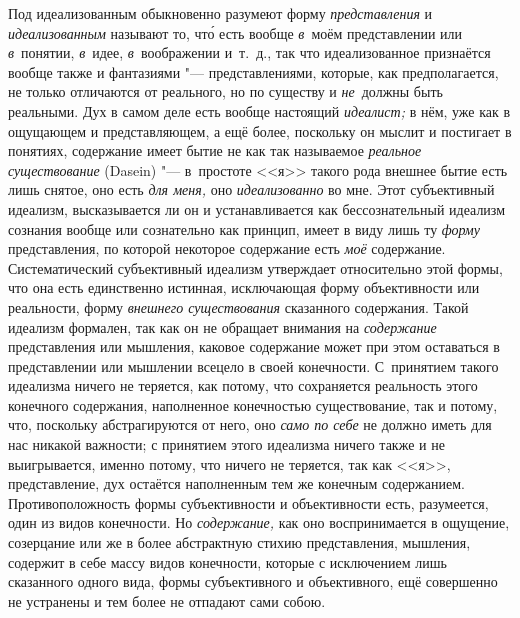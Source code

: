 Под идеализованным обыкновенно разумеют форму {\em представления} и
{\em идеализованным} называют то, чт\'{о} есть вообще
{\em в}~моём представлении или {\em в}~понятии, {\em в}~идее,
{\em в}~воображении и~т.~д., так что идеализованное
признаётся вообще также и фантазиями "--- представлениями, которые, как
предполагается, не только отличаются от реального, но по существу и
{\em не}~должны быть реальными. Дух в самом деле есть
вообще настоящий {\em идеалист;} в нём, уже как в
ощущающем и представляющем, а ещё более, поскольку он мыслит и постигает в
понятиях, содержание имеет бытие не как так называемое
{\em реальное существование} (Dasein) "--- в~простоте <<я>>
такого рода внешнее бытие есть лишь снятое, оно есть {\em для меня,} оно
{\em идеализованно} во мне. Этот субъективный идеализм,
высказывается ли он и устанавливается как бессознательный идеализм сознания
вообще или сознательно как принцип, имеет в виду лишь ту
{\em форму} представления, по которой некоторое
содержание есть {\em моё} содержание. Систематический
субъективный идеализм утверждает относительно этой формы, что она есть
единственно истинная, исключающая форму объективности или реальности, форму
{\em внешнего существования} сказанного содержания.
Такой идеализм формален, так как он не обращает внимания на
{\em содержание} представления или мышления, каковое
содержание может при этом оставаться в представлении или мышлении всецело в
своей конечности. С~принятием такого идеализма ничего не теряется, как
потому, что сохраняется реальность этого конечного содержания, наполненное
конечностью существование, так и потому, что, поскольку абстрагируются от
него, оно {\em само по себе} не должно иметь для нас
никакой важности; с принятием этого идеализма ничего также и не
выигрывается, именно потому, что ничего не теряется, так как <<я>>,
представление, дух остаётся наполненным тем же конечным содержанием.
Противоположность формы субъективности и объективности есть, разумеется,
один из видов конечности. Но {\em содержание,} как оно
воспринимается в ощущение, созерцание или же в более абстрактную стихию
представления, мышления, содержит в себе массу видов конечности, которые с
исключением лишь сказанного одного вида, формы субъективного и
объективного, ещё совершенно не устранены и тем более не отпадают сами собою.

\bigskip

